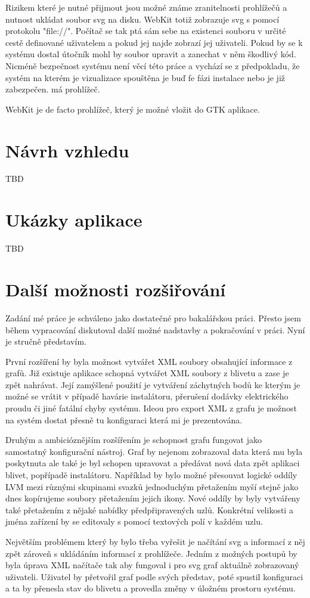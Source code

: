\documentclass[color,table,oneside,nolot,nolof]{fithesis}
\begin{document}
	Rizikem které je nutné přijmout jsou možné známe zranitelnosti prohlížečů a nutnost ukládat soubor svg na disku. WebKit totiž zobrazuje svg s pomocí protokolu "file://". Počítač se
	tak ptá sám sebe na existenci souboru v určité cestě definované uživatelem a pokud jej najde zobrazí jej uživateli. Pokud by se k systému dostal útočník mohl by soubor upravit a 
	zanechat v něm škodlivý kód. Nicméně bezpečnost systému není věcí této práce a vychází se z předpokladu, že systém na kterém je vizualizace spouštěna je buď fe fázi instalace nebo
	je již zabezpečen.
	má prohlížeč.

	WebKit je de facto prohlížeč, který je možné vložit do GTK aplikace.

\chapter{Návrh vzhledu}
TBD

\chapter{Ukázky aplikace}
TBD

\chapter{Další možnosti rozšiřování}
	Zadání mé práce je schváleno jako dostatečné pro bakalářskou práci. Přesto jsem během vypracování diskutoval další možné nadstavby a pokračování v práci. Nyní je stručně představím.

	První rozšíření by byla možnost vytvářet XML soubory obsahující informace z grafů. Již existuje aplikace schopná vytvářet XML soubory z blivetu a zase je zpět nahrávat. Její zamýšlené
	použití je vytváření záchytných bodů ke kterým je možné se vrátit v případě havárie instalátoru, přerušení dodávky elektrického proudu či jiné fatální chyby systému. Ideou pro export
	XML z grafu je možnost na systém dostat přesně tu konfiguraci která mi je prezentována.

	Druhým a ambicióznějším rozšířením je schopnost grafu fungovat jako samostatný konfigurační nástroj. Graf by nejenom zobrazoval data která mu byla poskytnuta ale také je byl
	schopen upravovat a předávat nová data zpět aplikaci blivet, popřípadě instalátoru. Například by bylo možné přesouvat logické oddíly LVM mezi různými skupinami svazků jednoduchým 
	přetažením myší stejně jako dnes kopírujeme soubory přetažením jejich ikony. Nové oddíly by byly vytvářeny také přetažením z nějaké nabídky předpřipravených uzlů. Konkrétní velikosti
	a jména zařízení by se editovaly s pomocí textových polí v každém uzlu.
	
	Největším problémem který by bylo třeba vyřešit je načítání svg a informací z něj zpět zároveň s ukládáním informací z prohlížeče. 
	Jedním z možných postupů by byla úprava XML načítače tak aby fungoval i pro svg graf aktuálně zobrazovaný uživateli. Uživatel by přetvořil graf podle svých představ, poté spustil 
	konfiguraci a ta by přenesla stav do blivetu a provedla změny v úložném prostoru systému. 

	\printbibliography
\end{document}
